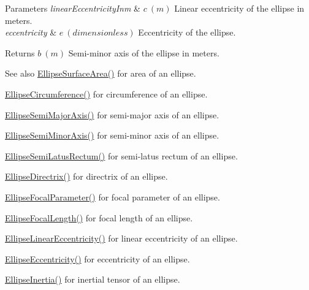 \begin{DoxyParams}{Parameters}
{\em linear\+Eccentricity\+Inm} & $ c\ (m)$ Linear eccentricity of the ellipse in meters. \\
\hline
{\em eccentricity} & $ e\ (dimensionless)$ Eccentricity of the ellipse. \\
\hline
\end{DoxyParams}
\begin{DoxyReturn}{Returns}
$ b\ (m)$ Semi-\/minor axis of the ellipse in meters. 
\end{DoxyReturn}
\begin{DoxySeeAlso}{See also}
\mbox{\hyperlink{group___e_g_x_math-_geometry-2_d-_ellipse-_surface_area_ga4ce8c8323e9718ce5458f4ab7f6d823d}{Ellipse\+Surface\+Area()}} for area of an ellipse. 

\mbox{\hyperlink{group___e_g_x_math-_geometry-2_d-_ellipse-_circumference_ga4172802ac674eb53467b44928ac635c7}{Ellipse\+Circumference()}} for circumference of an ellipse. 

\mbox{\hyperlink{group___e_g_x_math-_geometry-2_d-_ellipse-_semi_major_axis_ga646a2ca065f4ac3f666a9ea22f3bb527}{Ellipse\+Semi\+Major\+Axis()}} for semi-\/major axis of an ellipse. 

\mbox{\hyperlink{group___e_g_x_math-_geometry-2_d-_ellipse-_semi_minor_axis_gae461acf3333565d69527dd86e9aa2b32}{Ellipse\+Semi\+Minor\+Axis()}} for semi-\/minor axis of an ellipse. 

\mbox{\hyperlink{group___e_g_x_math-_geometry-2_d-_ellipse-_semi_latus_rectum_gacfd1844eb4ef3d1ee3c0b460a6442ae6}{Ellipse\+Semi\+Latus\+Rectum()}} for semi-\/latus rectum of an ellipse. 

\mbox{\hyperlink{group___e_g_x_math-_geometry-2_d-_ellipse-_directrix_gace8f72a8efbc9c18d3eb689151405106}{Ellipse\+Directrix()}} for directrix of an ellipse. 

\mbox{\hyperlink{group___e_g_x_math-_geometry-2_d-_ellipse-_focal_parameter_ga4cd01a38c72c092ef9791351948bf69b}{Ellipse\+Focal\+Parameter()}} for focal parameter of an ellipse. 

\mbox{\hyperlink{group___e_g_x_math-_geometry-2_d-_ellipse-_focal_length_gab8d63de7640c880cfecaeada6f2afdac}{Ellipse\+Focal\+Length()}} for focal length of an ellipse. 

\mbox{\hyperlink{group___e_g_x_math-_geometry-2_d-_ellipse-_linear_eccentricity_gac70b3010e30aa8b73deb50fe2b9b9a91}{Ellipse\+Linear\+Eccentricity()}} for linear eccentricity of an ellipse. 

\mbox{\hyperlink{group___e_g_x_math-_geometry-2_d-_ellipse-_eccentricity_ga6a0a7fba17f782616894cfc447628c33}{Ellipse\+Eccentricity()}} for eccentricity of an ellipse. 

\mbox{\hyperlink{group___e_g_x_math-_geometry-2_d-_ellipse-_inertia_ga10a3049c2f04b50f271fb01dc62e4cf8}{Ellipse\+Inertia()}} for inertial tensor of an ellipse. 
\end{DoxySeeAlso}
